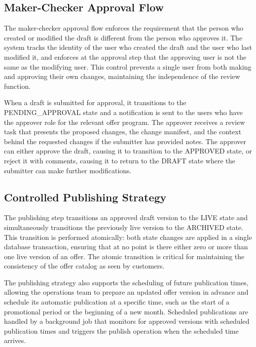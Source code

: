 \subsection{Maker-Checker Approval Flow}

The maker-checker approval flow enforces the requirement that the person who created or modified the draft is different from the person who approves it. The system tracks the identity of the user who created the draft and the user who last modified it, and enforces at the approval step that the approving user is not the same as the modifying user. This control prevents a single user from both making and approving their own changes, maintaining the independence of the review function.

When a draft is submitted for approval, it transitions to the PENDING\_APPROVAL state and a notification is sent to the users who have the approver role for the relevant offer program. The approver receives a review task that presents the proposed changes, the change manifest, and the context behind the requested changes if the submitter has provided notes. The approver can either approve the draft, causing it to transition to the APPROVED state, or reject it with comments, causing it to return to the DRAFT state where the submitter can make further modifications.

\subsection{Controlled Publishing Strategy}

The publishing step transitions an approved draft version to the LIVE state and simultaneously transitions the previously live version to the ARCHIVED state. This transition is performed atomically: both state changes are applied in a single database transaction, ensuring that at no point is there either zero or more than one live version of an offer. The atomic transition is critical for maintaining the consistency of the offer catalog as seen by customers.

The publishing strategy also supports the scheduling of future publication times, allowing the operations team to prepare an updated offer version in advance and schedule its automatic publication at a specific time, such as the start of a promotional period or the beginning of a new month. Scheduled publications are handled by a background job that monitors for approved versions with scheduled publication times and triggers the publish operation when the scheduled time arrives.

